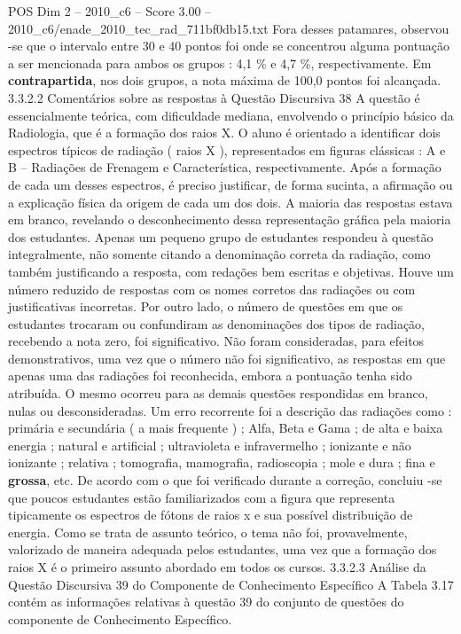 \begin{textsample}{POS Dim 2 – 2010\_c6 – Score 3.00 – 2010\_c6/enade\_2010\_tec\_rad\_711bf0db15.txt}
Fora desses patamares, observou -se que o intervalo entre 30 e 40 pontos foi onde se concentrou alguma pontuação a ser mencionada para ambos os grupos : 4,1 \% e 4,7 \%, respectivamente.
Em \textbf{contrapartida}, nos dois grupos, a nota máxima de 100,0 pontos foi alcançada. 3.3.2.2 Comentários sobre as respostas à Questão Discursiva 38 A questão é essencialmente teórica, com dificuldade mediana, envolvendo o princípio básico da Radiologia, que é a formação dos raios X.
O aluno é orientado a identificar dois espectros típicos de radiação ( raios X ), representados em figuras clássicas : A e B – Radiações de Frenagem e Característica, respectivamente.
Após a formação de cada um desses espectros, é preciso justificar, de forma sucinta, a afirmação ou a explicação física da origem de cada um dos dois.
A maioria das respostas estava em branco, revelando o desconhecimento dessa representação gráfica pela maioria dos estudantes.
Apenas um pequeno grupo de estudantes respondeu à questão integralmente, não somente citando a denominação correta da radiação, como também justificando a resposta, com redações bem escritas e objetivas.
Houve um número reduzido de respostas com os nomes corretos das radiações ou com justificativas incorretas.
Por outro lado, o número de questões em que os estudantes trocaram ou confundiram as denominações dos tipos de radiação, recebendo a nota zero, foi significativo.
Não foram consideradas, para efeitos demonstrativos, uma vez que o número não foi significativo, as respostas em que apenas uma das radiações foi reconhecida, embora a pontuação tenha sido atribuída.
O mesmo ocorreu para as demais questões respondidas em branco, nulas ou desconsideradas.
Um erro recorrente foi a descrição das radiações como : primária e secundária ( a mais frequente ) ; Alfa, Beta e Gama ; de alta e baixa energia ; natural e artificial ; ultravioleta e infravermelho ; ionizante e não ionizante ; relativa ; tomografia, mamografia, radioscopia ; mole e dura ; fina e \textbf{grossa}, etc.
De acordo com o que foi verificado durante a correção, concluiu -se que poucos estudantes estão familiarizados com a figura que representa tipicamente os espectros de fótons de raios x e sua possível distribuição de energia.
Como se trata de assunto teórico, o tema não foi, provavelmente, valorizado de maneira adequada pelos estudantes, uma vez que a formação dos raios X é o primeiro assunto abordado em todos os cursos. 3.3.2.3 Análise da Questão Discursiva 39 do Componente de Conhecimento Específico A Tabela 3.17 contém as informações relativas à questão 39 do conjunto de questões do componente de Conhecimento Específico.

\end{textsample}
